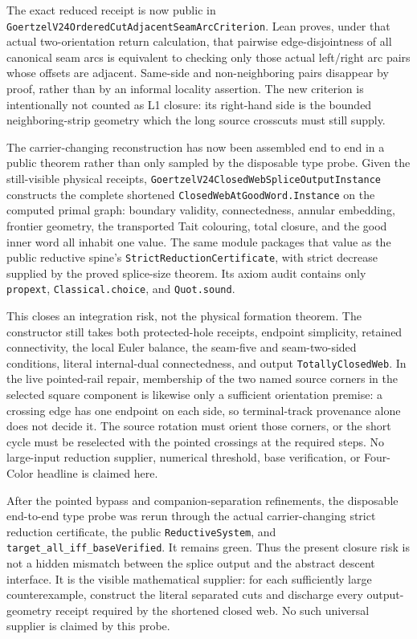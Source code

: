 \documentclass[11pt]{article}
\theoremstyle{definition}
\begin{document}
The exact reduced receipt is now public in
\texttt{GoertzelV24OrderedCutAdjacentSeamArcCriterion}.  Lean proves, under
that actual two-orientation return calculation, that pairwise edge-disjointness
of all canonical seam arcs is equivalent to checking only those actual
left/right arc pairs whose offsets are adjacent.  Same-side and non-neighboring
pairs disappear by proof, rather than by an informal locality assertion.  The
new criterion is intentionally not counted as L1 closure: its right-hand side
is the bounded neighboring-strip geometry which the long source crosscuts must
still supply.

The carrier-changing reconstruction has now been assembled end to end in a
public theorem rather than only sampled by the disposable type probe.  Given
the still-visible physical receipts,
\texttt{GoertzelV24ClosedWebSpliceOutputInstance} constructs the complete
shortened \texttt{ClosedWebAtGoodWord.Instance} on the computed primal graph:
boundary validity, connectedness, annular embedding, frontier geometry, the
transported Tait colouring, total closure, and the good inner word all inhabit
one value.  The same module packages that value as the public reductive
spine's \texttt{StrictReductionCertificate}, with strict decrease supplied by
the proved splice-size theorem.  Its axiom audit contains only
\texttt{propext}, \texttt{Classical.choice}, and \texttt{Quot.sound}.

This closes an integration risk, not the physical formation theorem.  The
constructor still takes both protected-hole receipts, endpoint simplicity,
retained connectivity, the local Euler balance, the seam-five and
seam-two-sided conditions, literal internal-dual connectedness, and output
\texttt{TotallyClosedWeb}.  In the live pointed-rail repair, membership of the
two named source corners in the selected square component is likewise only a
sufficient orientation premise: a crossing edge has one endpoint on each
side, so terminal-track provenance alone does not decide it.  The source
rotation must orient those corners, or the short cycle must be reselected with
the pointed crossings at the required steps.  No large-input reduction
supplier, numerical threshold, base verification, or Four-Color headline is
claimed here.

After the pointed bypass and companion-separation refinements, the disposable
end-to-end type probe was rerun through the actual carrier-changing strict
reduction certificate, the public \texttt{ReductiveSystem}, and
\texttt{target\_all\_iff\_baseVerified}.  It remains green.  Thus the present
closure risk is not a hidden mismatch between the splice output and the
abstract descent interface.  It is the visible mathematical supplier: for
each sufficiently large counterexample, construct the literal separated cuts
and discharge every output-geometry receipt required by the shortened closed
web.  No such universal supplier is claimed by this probe.
\end{document}
